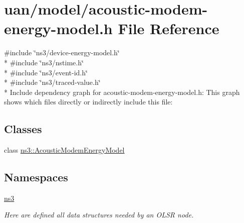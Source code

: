 \hypertarget{acoustic-modem-energy-model_8h}{}\section{uan/model/acoustic-\/modem-\/energy-\/model.h File Reference}
\label{acoustic-modem-energy-model_8h}
{\ttfamily \#include \char`\"{}ns3/device-\/energy-\/model.\+h\char`\"{}}\\*
{\ttfamily \#include \char`\"{}ns3/nstime.\+h\char`\"{}}\\*
{\ttfamily \#include \char`\"{}ns3/event-\/id.\+h\char`\"{}}\\*
{\ttfamily \#include \char`\"{}ns3/traced-\/value.\+h\char`\"{}}\\*
Include dependency graph for acoustic-\/modem-\/energy-\/model.h\+:
This graph shows which files directly or indirectly include this file\+:
\subsection*{Classes}
\begin{DoxyCompactItemize}
\item 
class \hyperlink{classns3_1_1AcousticModemEnergyModel}{ns3\+::\+Acoustic\+Modem\+Energy\+Model}
\end{DoxyCompactItemize}
\subsection*{Namespaces}
\begin{DoxyCompactItemize}
\item 
 \hyperlink{namespacens3}{ns3}
\begin{DoxyCompactList}\small\item\em Here are defined all data structures needed by an O\+L\+SR node. \end{DoxyCompactList}\end{DoxyCompactItemize}
